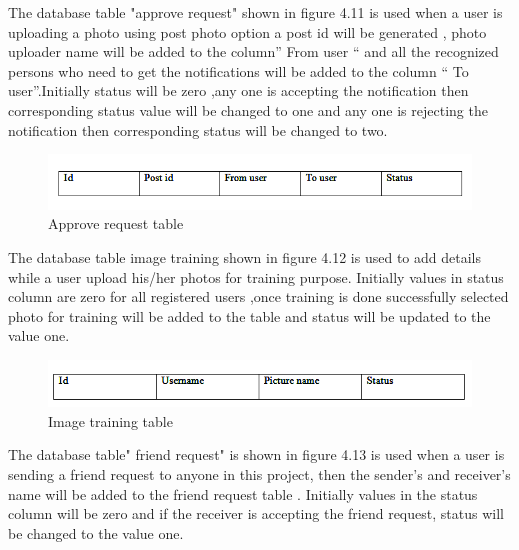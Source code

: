   \vspace*{1pc}
The database table "approve request" shown in figure 4.11 is used  when a user is uploading a photo using post photo option a post id will be generated , photo uploader name will be added to  the column” From user “ and all the recognized persons who need to get the notifications will be added to the column “ To user”.Initially status will be zero ,any one is accepting the notification then  corresponding status value will be changed to one and any one is  rejecting the notification  then corresponding status will be changed to two.
\begin{figure}[H]
\begin{minipage}{1\linewidth}
\centering
 \includegraphics[width=\textwidth]{tb1.png}
            \caption[Approve Request Table]{Approve request table}
             \label{art}
\end{minipage}
\end{figure}
\justifying
The database table image training shown in figure 4.12 is used to add details while a user upload his/her photos for training purpose. Initially   values in status column are  zero for all registered users ,once training   is done successfully selected photo for training will be added to the table and status will be updated to the value one.
\begin{figure}[H]   
\begin{minipage}{1\linewidth}
\centering
 \includegraphics[width=\textwidth]{tb2.png}
            \caption[Image Training Table]{Image training table}
             \label{itt}
\end{minipage}
\end{figure}
\justifying
The database table" friend request" is shown in figure 4.13 is used when a user is sending a friend request to anyone in this project, then the sender’s and receiver’s name will be added to the friend request table .  Initially  values in the status column will be zero and if the receiver is accepting the friend request, status will be changed to the value one.
